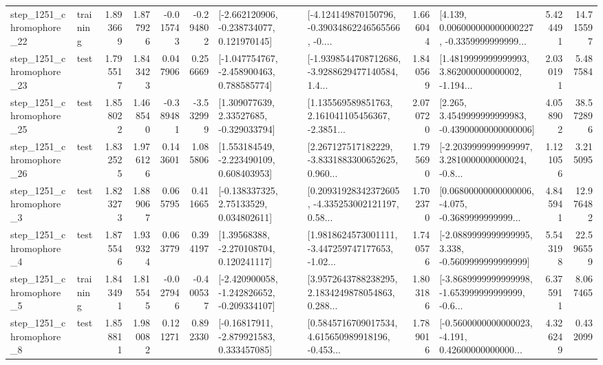 \begin{tabular}{llrrrrllrlrr}
 step\_1251\_chromophore\_22 &  training &      1.893669 &    1.877926 &     -0.015743 & -0.294802 &   [-2.662120906, -0.238734077, 0.121970145] &  [-4.124149870150796, -0.39034862246565566, -0.... &       1.666044 &  [4.139, 0.006000000000000227, -0.3359999999999... &            5.424491 &         14.715597 \\
 step\_1251\_chromophore\_23 &      test &      1.795517 &    1.843423 &      0.047906 &  0.256669 &   [-1.047754767, -2.458900463, 0.788585774] &  [-1.9398544708712686, -3.9288629477140584, 1.4... &       1.840569 &  [1.4819999999999993, 3.862000000000002, -1.194... &            2.030191 &          5.487584 \\
 step\_1251\_chromophore\_25 &      test &      1.858022 &    1.468540 &     -0.389481 & -3.532999 &     [1.309077639, 2.33527685, -0.329033794] &  [1.135569589851763, 2.161041105456367, -2.3851... &       2.070720 &  [2.265, 3.4549999999999983, -0.43900000000000006] &            4.058902 &         38.572896 \\
 step\_1251\_chromophore\_26 &      test &      1.832525 &    1.976126 &      0.143601 &  1.085806 &    [1.553184549, -2.223490109, 0.608403953] &  [2.267127517182229, -3.8331883300652625, 0.960... &       1.795690 &  [-2.2039999999999997, 3.2810000000000024, -0.8... &            1.121056 &          3.215095 \\
  step\_1251\_chromophore\_3 &      test &      1.823273 &    1.889067 &      0.065795 &  0.411665 &     [-0.138337325, 2.75133529, 0.034802611] &  [0.20931928342372605, -4.335253002121197, 0.58... &       1.702370 &  [0.06800000000000006, -4.075, -0.3689999999999... &            4.845941 &         12.976482 \\
  step\_1251\_chromophore\_4 &      test &      1.875546 &    1.939324 &      0.063779 &  0.394197 &     [1.39568388, -2.270108704, 0.120241117] &  [1.9818624573001111, -3.447259747177653, -1.02... &       1.740576 &  [-2.0889999999999995, 3.338, -0.5609999999999999] &            5.543198 &         22.596559 \\
  step\_1251\_chromophore\_5 &  training &      1.843491 &    1.815545 &     -0.027946 & -0.400537 &  [-2.420900058, -1.242826652, -0.209334107] &  [3.9572643788238295, 2.1834249878054863, 0.288... &       1.803186 &  [-3.8689999999999998, -1.653999999999999, -0.6... &            6.375911 &          8.067465 \\
  step\_1251\_chromophore\_8 &      test &      1.858811 &    1.980082 &      0.121271 &  0.892330 &    [-0.16817911, -2.879921583, 0.333457085] &  [0.5845716709017534, 4.615650989918196, -0.453... &       1.789016 &  [-0.5600000000000023, -4.191, 0.42600000000000... &            4.326249 &          0.432099 \\

\end{tabular}
